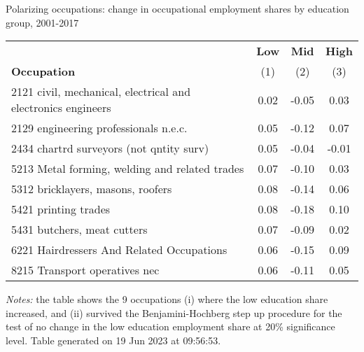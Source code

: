 \begin{center}
\begin{threeparttable}[!h]
\caption{Polarizing occupations: change in occupational employment shares by education group, 2001-2017}
\label{tab:pol_occ}
\begin{tabular}{lccc}
\toprule
\toprule
&\multicolumn{1}{c}{\textbf{Low}}&\multicolumn{1}{c}{\textbf{Mid}}&\multicolumn{1}{c}{\textbf{High}} \\
\textbf{Occupation}&\multicolumn{1}{c}{(1)}&\multicolumn{1}{c}{(2)}&\multicolumn{1}{c}{(3)} \\
\midrule
2121 civil, mechanical, electrical and electronics engineers&        0.02&       -0.05&        0.03\\
2129 engineering professionals n.e.c.&        0.05&       -0.12&        0.07\\
2434 chartrd surveyors (not qntity surv)&        0.05&       -0.04&       -0.01\\
5213 Metal forming, welding and related trades&        0.07&       -0.10&        0.03\\
5312 bricklayers, masons, roofers&        0.08&       -0.14&        0.06\\
5421 printing trades&        0.08&       -0.18&        0.10\\
5431 butchers, meat cutters&        0.07&       -0.09&        0.02\\
6221 Hairdressers And Related Occupations&        0.06&       -0.15&        0.09\\
8215 Transport operatives nec&        0.06&       -0.11&        0.05\\
\bottomrule
\bottomrule
\end{tabular}
\begin{tablenotes}
\item \footnotesize \textit{Notes:} the table shows the 9 occupations (i) where the low education share increased, and (ii) survived the Benjamini-Hochberg step up procedure for the test of no change in the low education employment share at 20\% significance level. Table generated on 19 Jun 2023 at 09:56:53.
\end{tablenotes}
\end{threeparttable}
\end{center}
